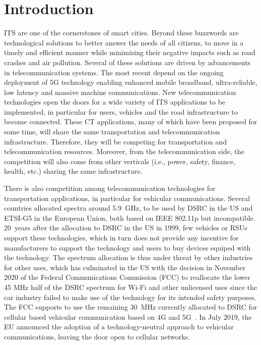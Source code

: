 \section{Introduction}
\acrfull{ITS} are one of the cornerstones of smart cities. Beyond these buzzwords are technological solutions to better answer the needs of all citizens, to move in a timely and efficient manner while minimizing their negative impacts such as road crashes and air pollution. 
Several of these solutions are driven by advancements in telecommunication systems. The most recent depend on the ongoing deployment of 5G technology enabling enhanced mobile broadband, ultra-reliable, low latency and massive machine communications. New telecommunication technologies open the doors for a wide variety of \acrfull{ITS} applications to be implemented, in particular for users, vehicles and the road infrastructure to become connected. 
These \acrfull{CT} applications, many of which have been proposed for some time, will share the same transportation and telecommunication infrastructure. Therefore, they will be competing for transportation and telecommunication resources. Moreover, from the telecommunication side, the competition will also come from other verticals (i.e., power, safety, finance, health, etc.) sharing the same infrastructure.

There is also competition among telecommunication technologies for transportation applications, in particular for vehicular communications. Several countries allocated spectra around 5.9~GHz, to be used by \acrfull{DSRC} in the US and ETSI-G5 in the European Union, both based on IEEE 802.11p but incompatible. 20~years after the allocation to \acrshort{DSRC} in the US in 1999, few vehicles or \acrfull{RSU}s support these technologies, which in turn does not provide any incentive for manufacturers to support the technology and users to buy devices equiped with the technology. The spectrum allocation is thus under threat by other industries for other uses, which has culminated in the US with the decision in November 2020 of the Federal Communications Commission (FCC) to reallocate the lower 45 MHz half of the DSRC spectrum for Wi-Fi and other unlicensed uses since the car industry failed to make use of the technology for its intended safety purposes. The FCC supports to use the remaining 30~MHz currently allocated to DSRC for cellular based vehicular communication based on 4G and 5G~\cite{brodkin_fcc_2020}. %
In July 2019, the EU announced the adoption of a technology-neutral approach to vehicular communications, leaving the door open to cellular networks. 

